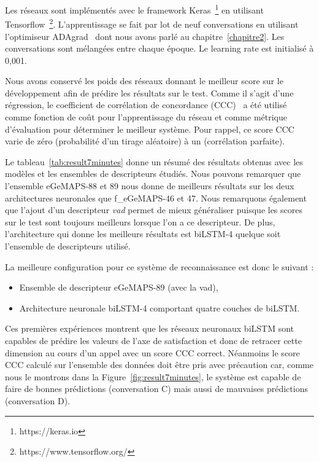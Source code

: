 

Les réseaux sont implémentés avec le framework Keras~\footnote{https://keras.io} en utilisant Tensorflow~\footnote{https://www.tensorflow.org/}. L'apprentissage se fait par lot de neuf conversations en utilisant l'optimiseur ADAgrad~\cite{Duchi2011} dont nous avons parlé au chapitre~\ref{chapitre2}. Les conversations sont mélangées entre chaque époque. Le learning rate est initialisé à 0,001.

Nous avons conservé les poids des réseaux donnant le meilleur score sur le développement afin de prédire les résultats sur le test.
Comme il s'agit d'une régression, le coefficient de corrélation de concordance (CCC)~\cite{CCC} a été utilisé comme fonction de coût pour l'apprentissage du réseau et comme métrique d'évaluation pour déterminer le meilleur système.
Pour rappel, ce score CCC varie de zéro (probabilité d'un tirage aléatoire) à un (corrélation parfaite).



Le tableau~\ref{tab:result7minutes} donne un résumé des résultats obtenus avec les modèles et les ensembles de descripteurs étudiés.
Nous pouvons remarquer que l'ensemble eGeMAPS-88 et 89 nous donne de meilleurs résultats sur les deux architectures neuronales que f\_eGeMAPS-46 et 47. Nous remarquons également que l'ajout d'un descripteur \textit{vad} permet de mieux généraliser puisque les scores sur le test sont toujours meilleurs lorsque l'on a ce descripteur. De plus, l'architecture qui donne les meilleurs résultats est biLSTM-4 quelque soit l'ensemble de descripteurs utilisé.

La meilleure configuration pour ce système de reconnaissance est donc le suivant :
\begin{itemize}
  \item Ensemble de descripteur eGeMAPS-89 (avec la vad),
  \item Architecture neuronale biLSTM-4 comportant quatre couches de biLSTM.
\end{itemize}

Ces premières expériences montrent que les réseaux neuronaux biLSTM sont capables de prédire les valeurs de l'axe de satisfaction et donc de retracer cette dimension au cours d’un appel avec un score CCC correct. Néanmoins le score CCC calculé sur l'ensemble des données doit être pris avec précaution car, comme nous le montrons dans la Figure~\ref{fig:result7minutes}, le système est capable de faire de bonnes prédictions (conversation C) mais aussi de mauvaises prédictions (conversation D).

